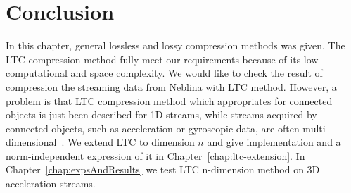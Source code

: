 \section{Conclusion}


In this chapter, general lossless and lossy compression methods was given. The
LTC compression method fully meet our requirements because of its low
computational and space complexity. We would like to check the result of
compression the streaming data from Neblina with LTC method. However, a problem
is that LTC compression method which appropriates for connected objects is just
been described for 1D streams, while streams acquired by connected objects, such
as acceleration or gyroscopic data, are often
multi-dimensional~\cite{li2018multi}. We extend LTC to dimension $n$ and give
implementation and a norm-independent expression of it in
Chapter~\ref{chap:ltc-extension}. In Chapter~\ref{chap:expsAndResults} we test
LTC n-dimension method on 3D acceleration streams.
